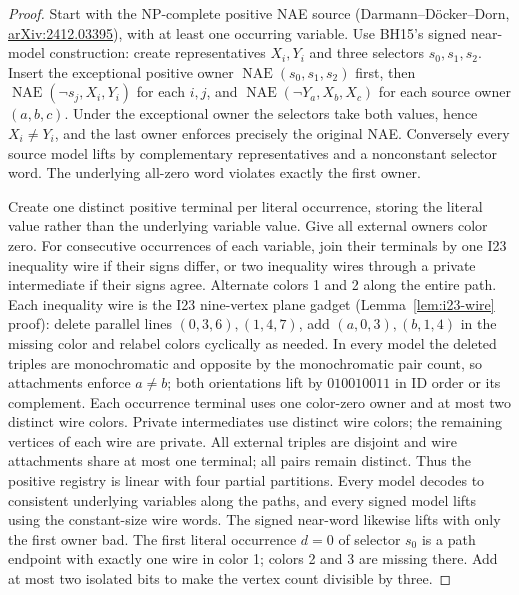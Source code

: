 \documentclass[11pt]{article}
\begin{document}
\begin{proof}
Start with the NP-complete positive NAE source (Darmann--D\"ocker--Dorn, \href{https://arxiv.org/abs/2412.03395}{arXiv:2412.03395}), with at least one occurring variable. Use BH15's signed near-model construction: create representatives $X_i,Y_i$ and three selectors $s_0,s_1,s_2$. Insert the exceptional positive owner $\operatorname{NAE}(s_0,s_1,s_2)$ first, then $\operatorname{NAE}(\neg s_j,X_i,Y_i)$ for each $i,j$, and $\operatorname{NAE}(\neg Y_a,X_b,X_c)$ for each source owner $(a,b,c)$. Under the exceptional owner the selectors take both values, hence $X_i\ne Y_i$, and the last owner enforces precisely the original NAE. Conversely every source model lifts by complementary representatives and a nonconstant selector word. The underlying all-zero word violates exactly the first owner.

Create one distinct positive terminal per literal occurrence, storing the literal value rather than the underlying variable value. Give all external owners color zero. For consecutive occurrences of each variable, join their terminals by one I23 inequality wire if their signs differ, or two inequality wires through a private intermediate if their signs agree. Alternate colors 1 and 2 along the entire path. Each inequality wire is the I23 nine-vertex plane gadget (Lemma~\ref{lem:i23-wire} proof): delete parallel lines $(0,3,6),(1,4,7)$, add $(a,0,3),(b,1,4)$ in the missing color and relabel colors cyclically as needed. In every model the deleted triples are monochromatic and opposite by the monochromatic pair count, so attachments enforce $a\ne b$; both orientations lift by $010010011$ in ID order or its complement. Each occurrence terminal uses one color-zero owner and at most two distinct wire colors. Private intermediates use distinct wire colors; the remaining vertices of each wire are private. All external triples are disjoint and wire attachments share at most one terminal; all pairs remain distinct. Thus the positive registry is linear with four partial partitions. Every model decodes to consistent underlying variables along the paths, and every signed model lifts using the constant-size wire words. The signed near-word likewise lifts with only the first owner bad. The first literal occurrence $d=0$ of selector $s_0$ is a path endpoint with exactly one wire in color 1; colors 2 and 3 are missing there. Add at most two isolated bits to make the vertex count divisible by three.


\end{proof}
\end{document}

